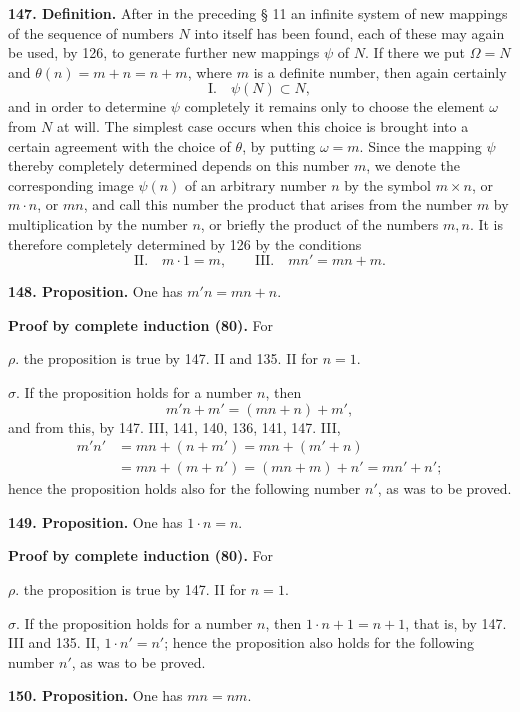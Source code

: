 \documentclass[11pt]{article}
\newcommand{\partof}{\mathrel{\subset}}
\begin{document}
\noindent\textbf{147. Definition.} After in the preceding § 11 an infinite system of new mappings of the sequence of numbers $N$ into itself has been found, each of these may again be used, by 126, to generate further new mappings $\psi$ of $N$. If there we put $\Omega=N$ and $\theta(n)=m+n=n+m$, where $m$ is a definite number, then again certainly
\[
\text{I.}\quad \psi(N)\partof N,
\]
and in order to determine $\psi$ completely it remains only to choose the element $\omega$ from $N$ at will. The simplest case occurs when this choice is brought into a certain agreement with the choice of $\theta$, by putting $\omega=m$. Since the mapping $\psi$ thereby completely determined depends on this number $m$, we denote the corresponding image $\psi(n)$ of an arbitrary number $n$ by the symbol $m\times n$, or $m\cdot n$, or $mn$, and call this number the product that arises from the number $m$ by multiplication by the number $n$, or briefly the product of the numbers $m,n$. It is therefore completely determined by 126 by the conditions
\[
\text{II.}\quad m\cdot1=m,
\qquad
\text{III.}\quad mn'=mn+m.
\]

\noindent\textbf{148. Proposition.} One has $m'n=mn+n$.

\noindent\textbf{Proof by complete induction (80).} For

\noindent $\rho.$ the proposition is true by 147. II and 135. II for $n=1$.

\noindent $\sigma.$ If the proposition holds for a number $n$, then
\[
m'n+m'=(mn+n)+m',
\]
and from this, by 147. III, 141, 140, 136, 141, 147. III,
\begin{align*}
m'n'&=mn+(n+m')=mn+(m'+n)\\
&=mn+(m+n')=(mn+m)+n'=mn'+n';
\end{align*}
hence the proposition holds also for the following number $n'$, as was to be proved.

\noindent\textbf{149. Proposition.} One has $1\cdot n=n$.

\noindent\textbf{Proof by complete induction (80).} For

\noindent $\rho.$ the proposition is true by 147. II for $n=1$.

\noindent $\sigma.$ If the proposition holds for a number $n$, then $1\cdot n+1=n+1$, that is, by 147. III and 135. II, $1\cdot n'=n'$; hence the proposition also holds for the following number $n'$, as was to be proved.

\noindent\textbf{150. Proposition.} One has $mn=nm$.
\end{document}
